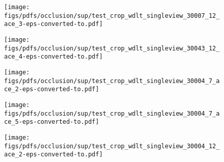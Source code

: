 \documentclass[runningheads]{llncs}
\begin{document}
\begin{figure*}[t!]
\begin{subfigure}[b]{0.16\linewidth}
    \end{subfigure}
    \begin{subfigure}[b]{0.16\linewidth}        \centering
        \texttt{[image: figs/pdfs/occlusion/sup/test\_crop\_wdlt\_singleview\_30007\_12\_ace\_3-eps-converted-to.pdf]}
    \end{subfigure}
    \begin{subfigure}[b]{0.16\linewidth}        \centering
        \texttt{[image: figs/pdfs/occlusion/sup/test\_crop\_wdlt\_singleview\_30043\_12\_ace\_4-eps-converted-to.pdf]}
    \end{subfigure}
    \begin{subfigure}[b]{0.16\linewidth}        \centering
        \texttt{[image: figs/pdfs/occlusion/sup/test\_crop\_wdlt\_singleview\_30004\_7\_ace\_2-eps-converted-to.pdf]}
    \end{subfigure}
    \begin{subfigure}[b]{0.16\linewidth}        \centering
        \texttt{[image: figs/pdfs/occlusion/sup/test\_crop\_wdlt\_singleview\_30004\_7\_ace\_5-eps-converted-to.pdf]}
    \end{subfigure}
    \begin{subfigure}[b]{0.16\linewidth}        \centering
        \texttt{[image: figs/pdfs/occlusion/sup/test\_crop\_wdlt\_singleview\_30004\_12\_ace\_2-eps-converted-to.pdf]}
    \end{subfigure} \\ \vspace{1mm}
    
    
    
    \begin{subfigure}[b]{0.16\linewidth}        \centering


        

\end{subfigure}
\end{figure*}
\end{document}
